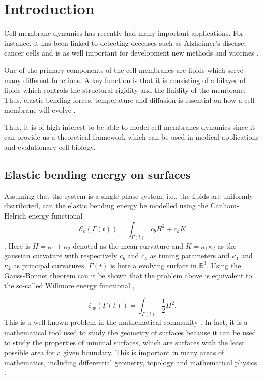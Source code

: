 \section{Introduction}\label{sec:introduction}

Cell membrane dynamics has recently had many important applications. For instance, it has been linked to detecting deceases such as Alzheimer's disease, cancer cells and is as well important for development new methods and vaccines \cite{small2006sorting}.

One of the primary components of the cell membranes are lipids which serve many different functions. A key function is that it is consisting of a bilayer of lipids which controls the structural rigidity and the fluidity of the membrane. Thus, elastic
bending forces, temperature and diffusion is essential on how a cell membrane will evolve \cite{neidleman87, }.

 Thus, it is of high interest to be able to model cell membranes dynamics since it can provide us a theoretical framework which can be used in medical applications and evolutionary cell-biology.



\subsection{Elastic bending energy on surfaces}%
\label{sub:willmore_flow}

Assuming that the system is a single-phase system, i.e., the lipids are uniformly distributed, can the elastic bending energy be modelled using the Canham-Helrich energy functional \cite{helfrich1973elastic, wang08, udo97} \[
\mathcal{E} _{e}\left( \Gamma\left( t \right)   \right) =   \int_{\Gamma\left( t \right)  }^{}  c_{b} H^{2} + c_{k} K
\].
Here is $H =  \kappa_1 + \kappa_2 $ denoted as the mean curvature and $K = \kappa_1 \kappa_2$ as the gaussian curvature with respectively $c_{b}$ and $c_{k}$ as tuning parameters and $\kappa_1$ and $\kappa_2$ as principal curvatures. $\Gamma \left( t
\right) $ is here a evolving surface in $\mathbb{R} ^3$. Using the Gauss-Bonnet theorem can it be shown that the problem above is equivalent to the so-called Willmore energy
functional \cite{montiel2009curves, willmore1996riemannian},

\begin{equation}
\label{eq:WE}
\mathcal{E} _{w} \left( \Gamma\left( t \right)   \right) = \int_{\Gamma\left( t \right)  }^{} \frac{1}{2} H ^2
.\end{equation}
This is a well known problem in the mathematical community \cite{ topping2000towards, marques2014willmore,link2013gradient,kuwert2012willmore}. In fact, it is a mathematical tool used to study the geometry of surfaces because it can be used to study the properties of minimal surfaces, which are surfaces with the least possible area for a given boundary. This is important in many areas of mathematics, including differential geometry, topology and mathematical physics \cite{koerber2021area,jakob2022singularities, rupp21}.


